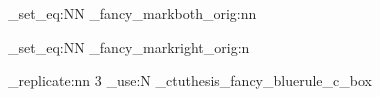 \cs_set_eq:NN \ctuthesis_fancy_markboth_orig:nn \markboth
\cs_set_eq:NN \ctuthesis_fancy_markright_orig:n \markright
\let\markboth\@gobbletwo
\let\markright\@gobble

\renewcommand \chaptermark [1] { \ctuthesis_fancy_markboth_orig:nn { \thechapter.\ #1 }{ \thechapter.\ #1 } }
\renewcommand \sectionmark [1] { \ctuthesis_fancy_markright_orig:n { \thesection.\ #1 } }

\newcommand \chapterstarmark [1] { \ctuthesis_fancy_markboth_orig:nn { #1 } { #1 } }
\newcommand \sectionstarmark [1] { \ctuthesis_fancy_markright_orig:n { #1 } }

\DeclareDocumentCommand {} {
	\clearpage
	\if@twoside\ifodd\c@page\else
		 {
			\leavevmode
			\thispagestyle{empty}
		} {
			\hbox{}\vspace*{\fill}
			\centerline { \prg_replicate:nn { 3 } { \box_use:N \g_ctuthesis_fancy_bluerule_c_box } }
			\vspace*{\fill}
			\hbox{}
			\thispagestyle{cleardoublepage}
		}
		\newpage
		\if@twocolumn\hbox{}\newpage\fi
	\fi\fi
}






